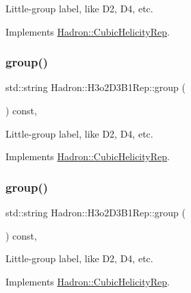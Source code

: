 Little-\/group label, like D2, D4, etc. 

Implements \mbox{\hyperlink{structHadron_1_1CubicHelicityRep_a101a7d76cd8ccdad0f272db44b766113}{Hadron\+::\+Cubic\+Helicity\+Rep}}.

\mbox{\label{structHadron_1_1H3o2D3B1Rep_a0839d8685752d851d9175eb3cfb568d7}} 
\subsubsection{\texorpdfstring{group()}{group()}\hspace{0.1cm}{\footnotesize\ttfamily [2/3]}}
{\footnotesize\ttfamily std\+::string Hadron\+::\+H3o2\+D3\+B1\+Rep\+::group (\begin{DoxyParamCaption}{ }\end{DoxyParamCaption}) const\hspace{0.3cm}{\ttfamily [inline]}, {\ttfamily [virtual]}}

Little-\/group label, like D2, D4, etc. 

Implements \mbox{\hyperlink{structHadron_1_1CubicHelicityRep_a101a7d76cd8ccdad0f272db44b766113}{Hadron\+::\+Cubic\+Helicity\+Rep}}.

\mbox{\label{structHadron_1_1H3o2D3B1Rep_a0839d8685752d851d9175eb3cfb568d7}} 
\subsubsection{\texorpdfstring{group()}{group()}\hspace{0.1cm}{\footnotesize\ttfamily [3/3]}}
{\footnotesize\ttfamily std\+::string Hadron\+::\+H3o2\+D3\+B1\+Rep\+::group (\begin{DoxyParamCaption}{ }\end{DoxyParamCaption}) const\hspace{0.3cm}{\ttfamily [inline]}, {\ttfamily [virtual]}}

Little-\/group label, like D2, D4, etc. 

Implements \mbox{\hyperlink{structHadron_1_1CubicHelicityRep_a101a7d76cd8ccdad0f272db44b766113}{Hadron\+::\+Cubic\+Helicity\+Rep}}.

